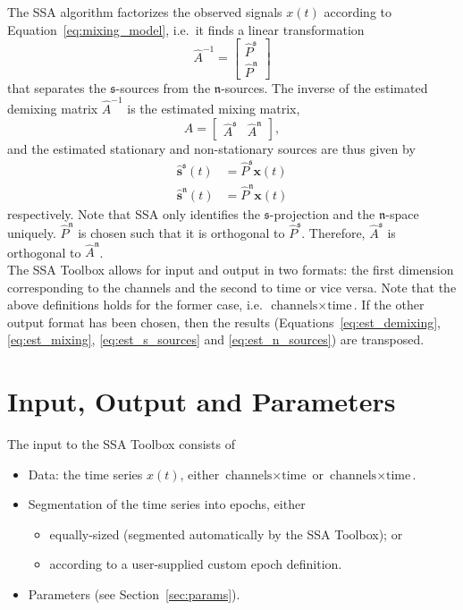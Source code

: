 \documentclass{article}
\newcommand{\1}{\ensuremath{\mathds{1}}}
\newcommand{\s}{\ensuremath{\mathfrak{s}}}
\newcommand{\n}{\ensuremath{\mathfrak{n}}}
\newcommand{\0}{\ensuremath{0}}
\begin{document}
The SSA algorithm factorizes the observed signals $x(t)$ according to
Equation~\ref{eq:mixing_model}, i.e.~it finds a linear transformation
\begin{equation}
\label{eq:est_demixing}
  \hat{A}^{-1} = \begin{bmatrix} \hat{P}^{\s} \\ \hat{P}^{\n} \end{bmatrix}
\end{equation}
that separates the \s-sources from the \n-sources. The inverse of the estimated 
demixing matrix $\hat{A}^{-1}$ is the estimated mixing matrix, 
\begin{equation}
\label{eq:est_mixing}
 \hat{A} = \begin{bmatrix} \hat{A}^{\s} & \hat{A}^{\n} \end{bmatrix}, 
\end{equation}
and the estimated stationary and non-stationary sources are thus given by
\begin{align}
\label{eq:est_s_sources}
  \hat{\mathbf s}^{\s}(t) & = \hat{P}^{\s} {\mathbf x}(t) \\
\label{eq:est_n_sources}
  \hat{\mathbf s}^{\n}(t) & = \hat{P}^{\n} {\mathbf x}(t) 
\end{align}
respectively.
Note that SSA only identifies the $\s$-projection and the $\n$-space uniquely.
$\hat P^{\n}$ is chosen such that it is orthogonal to $\hat P^{\s}$.
Therefore, $\hat A^{\s}$ is orthogonal to $\hat A^{\n}$.\\
The SSA Toolbox allows for input and output in two formats: the first
dimension corresponding to the channels and the second to time or vice versa.  
Note that the above definitions holds for the former case, 
i.e.~$\text{channels} \times \text{time}$. If the other output format has
been chosen, then the results (Equations~\ref{eq:est_demixing}, \ref{eq:est_mixing}, 
\ref{eq:est_s_sources} and \ref{eq:est_n_sources}) are transposed.

\section{Input, Output and Parameters}

The input to the SSA Toolbox consists of
\begin{itemize}
 \item Data: the time series $x(t)$, either $\text{channels} \times \text{time}$ or 
				$\text{channels} \times \text{time}$.

 \item Segmentation of the time series into epochs, either
	\begin{itemize}
	  \item equally-sized (segmented automatically by the SSA Toolbox); or 
	  \item according to a user-supplied custom epoch definition. 
	\end{itemize}

 \item Parameters (see Section~\ref{sec:params}).
\end{itemize}
\end{document}
